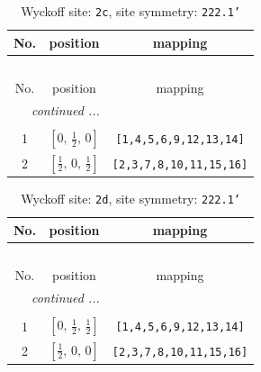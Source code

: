 \documentclass[fleqn,8pt]{jsarticle}
\begin{document}
\renewcommand{\arraystretch}{1.2}
\begin{longtable}{ccc}
\caption{Wyckoff site: {\tt 2c}, site symmetry: {\tt 222.1'}}
 \\
 \hline \hline
No. & position & mapping \\ \hline \endfirsthead

\multicolumn{2}{l}{\tablename\ \thetable{}} \\
 \hline \hline
No. & position & mapping \\ \hline \endhead

 \hline \hline
\multicolumn{2}{r}{\footnotesize\it continued ...} \\ \endfoot

 \hline \hline
\multicolumn{2}{r}{} \\ \endlastfoot

1 & $\left[ 0,\, \frac{1}{2},\, 0 \right]$ & {\tt [1,4,5,6,9,12,13,14]} \\ \hline
2 & $\left[ \frac{1}{2},\, 0,\, \frac{1}{2} \right]$ & {\tt [2,3,7,8,10,11,15,16]} \\
\end{longtable}
\renewcommand{\arraystretch}{1.2}
\begin{longtable}{ccc}
\caption{Wyckoff site: {\tt 2d}, site symmetry: {\tt 222.1'}}
 \\
 \hline \hline
No. & position & mapping \\ \hline \endfirsthead

\multicolumn{2}{l}{\tablename\ \thetable{}} \\
 \hline \hline
No. & position & mapping \\ \hline \endhead

 \hline \hline
\multicolumn{2}{r}{\footnotesize\it continued ...} \\ \endfoot

 \hline \hline
\multicolumn{2}{r}{} \\ \endlastfoot

1 & $\left[ 0,\, \frac{1}{2},\, \frac{1}{2} \right]$ & {\tt [1,4,5,6,9,12,13,14]} \\ \hline
2 & $\left[ \frac{1}{2},\, 0,\, 0 \right]$ & {\tt [2,3,7,8,10,11,15,16]} \\
\end{longtable}
\renewcommand{\arraystretch}{1.2}
\end{document}
